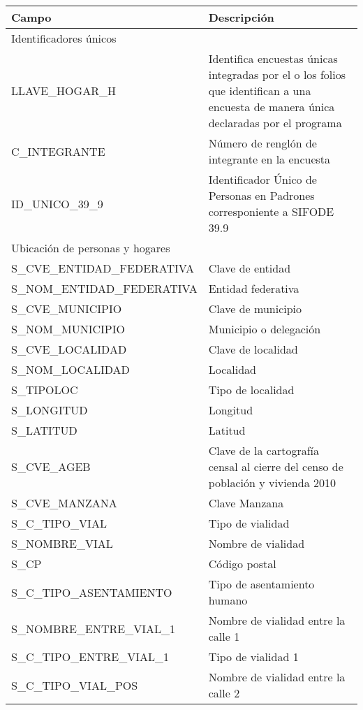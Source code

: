 \begin{longtable}{|p{8cm}|p{8cm}|}
    \hline
    \hline
    Campo  & Descripción\\
    \hline
    \hline
    \multicolumn{2}{l}{Identificadores únicos}\\
    \hline
    LLAVE\_HOGAR\_H & Identifica encuestas únicas integradas por el o los folios que identifican a una encuesta de manera única declaradas por el programa\\
    \hline
    C\_INTEGRANTE & Número de renglón de integrante en la encuesta\\
    \hline
    ID\_UNICO\_39\_9 & Identificador Único de Personas en Padrones corresponiente a SIFODE 39.9\\
    \hline
    \hline
    \multicolumn{2}{l}{Ubicación de personas y hogares}\\
    \hline
    S\_CVE\_ENTIDAD\_FEDERATIVA & Clave de entidad \\
    \hline
    S\_NOM\_ENTIDAD\_FEDERATIVA & Entidad federativa \\
    \hline
    S\_CVE\_MUNICIPIO & Clave de municipio\\
    \hline
    S\_NOM\_MUNICIPIO & Municipio o delegación\\
    \hline
    S\_CVE\_LOCALIDAD & Clave de localidad\\
    \hline
    S\_NOM\_LOCALIDAD & Localidad \\
    \hline
    S\_TIPOLOC & Tipo de localidad \\
    \hline
    S\_LONGITUD & Longitud \\
    \hline
    S\_LATITUD & Latitud \\
    \hline
    S\_CVE\_AGEB & Clave de la cartografía censal al cierre del censo de población y vivienda 2010 \\
    \hline
    S\_CVE\_MANZANA & Clave Manzana \\
    \hline
    S\_C\_TIPO\_VIAL & Tipo de vialidad \\
    \hline
    S\_NOMBRE\_VIAL & Nombre de vialidad \\
    \hline
    S\_CP & Código postal \\
    \hline
    S\_C\_TIPO\_ASENTAMIENTO & Tipo de asentamiento humano \\
    \hline
    S\_NOMBRE\_ENTRE\_VIAL\_1 & Nombre de vialidad entre la calle 1 \\
    \hline
    S\_C\_TIPO\_ENTRE\_VIAL\_1 & Tipo de vialidad 1 \\
    \hline
    S\_C\_TIPO\_VIAL\_POS & Nombre de vialidad entre la calle 2 \\

\end{longtable}

